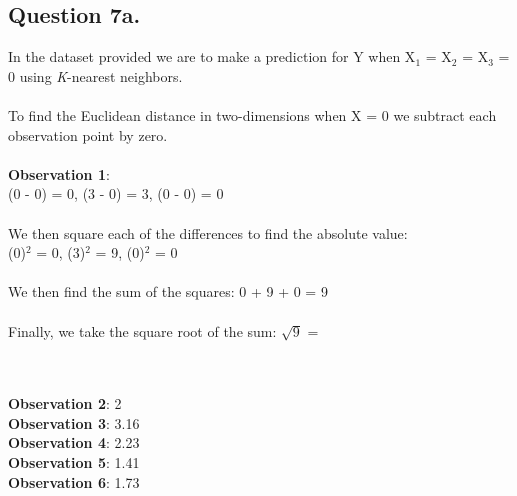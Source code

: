 \documentclass{article}
\begin{document}
\subsection*{Question 7a.}
In the dataset provided we are to make a prediction for Y when X$_{1}$ = X$_{2}$ = X$_{3}$ = 0 using \textit{K}-nearest neighbors. \\ \\
To find the Euclidean distance in two-dimensions when X = 0 we subtract each observation point by zero. \\ \\
\textbf{Observation 1}: \\
(0 - 0) = 0, (3 - 0) = 3, (0 - 0)  = 0 \\ \\
We then square each of the differences to find the absolute value: \\ 
(0)$^{2}$  = 0, (3)$^{2}$ = 9, (0)$^{2}$ = 0 \\ \\
We then find the sum of the squares: 
0 + 9 + 0 = 9 \\ \\
Finally, we take the square root of the sum:
$\sqrt{9}$ = 
\\ \\
\textbf{Observation 2}: 2 \\
\textbf{Observation 3}: 3.16 \\
\textbf{Observation 4}: 2.23 \\
\textbf{Observation 5}: 1.41 \\
\textbf{Observation 6}: 1.73 \\ 
\end{document}
